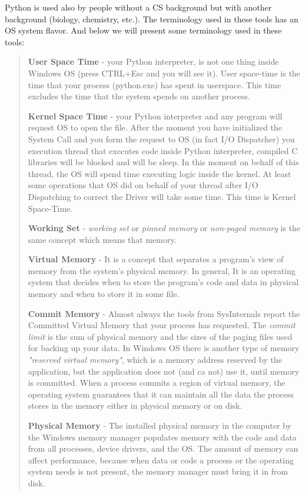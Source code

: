 \documentclass[
]{article}
\begin{document}
Python is used also by people without a CS background but with another
background (biology, chemistry, etc.). The terminology used in these
tools has an OS system flavor. And below we will present some
terminology used in these tools:

\begin{quote}
\textbf{User Space Time} - your Python interpreter, is not one thing
inside Windows OS (press CTRL+Esc and you will see it). User space-time
is the time that your process (python.exe) has spent in userspace. This
time excludes the time that the system spends on another process.

\textbf{Kernel Space Time} - your Python interpreter and any program
will request OS to open the file. After the moment you have initialized
the System Call and you form the request to OS (in fact I/O Dispatcher)
you execution thread that executes code inside Python interpreter,
compiled C libraries will be blocked and will be sleep. In this moment
on behalf of this thread, the OS will spend time executing logic inside
the kernel. At least some operations that OS did on behalf of your
thread after I/O Dispatching to correct the Driver will take some time.
This time is Kernel Space-Time.

\textbf{Working Set} - \emph{working set} or \emph{pinned memory} or
\emph{non-paged memory} is the same concept which means that memory.

\textbf{Virtual Memory} - It is a concept that separates a program's
view of memory from the system's physical memory. In general, It is an
operating system that decides when to store the program's code and data
in physical memory and when to store it in some file.

\textbf{Commit Memory} - Almost always the tools from SysInternals
report the Committed Virtual Memory that your process has requested. The
\emph{commit limit} is the sum of physical memory and the sizes of the
paging files used for backing up your data. In Windows OS there is
another type of memory \emph{"reserved virtual memory"}, which is a
memory address reserved by the application, but the application does not
(and ca not) use it, until memory is committed. When a process commits a
region of virtual memory, the operating system guarantees that it can
maintain all the data the process stores in the memory either in
physical memory or on disk.

\textbf{Physical Memory} - The installed physical memory in the computer
by the Windows memory manager populates memory with the code and data
from all processes, device drivers, and the OS. The amount of memory can
affect performance, because when data or code a process or the operating
system needs is not present, the memory manager must bring it in from
disk.


\end{quote}
\end{document}
